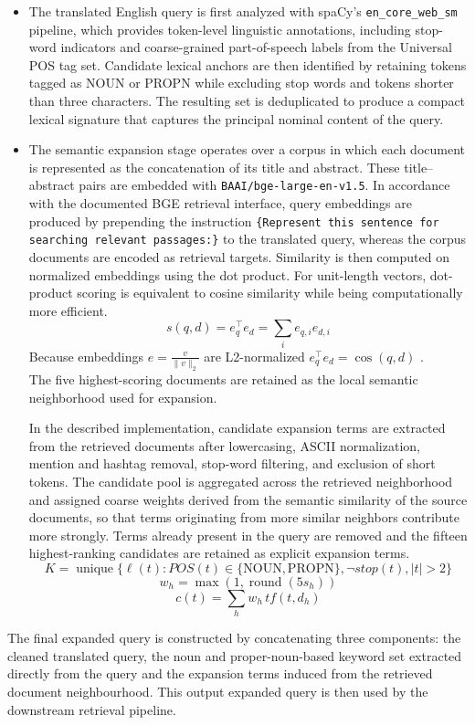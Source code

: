 \begin{itemize}
    \item The translated English query is first analyzed with spaCy’s \texttt{en\_core\_web\_sm} pipeline, which provides token-level linguistic annotations, including stop-word indicators and coarse-grained part-of-speech labels from the Universal POS tag set. Candidate lexical anchors are then identified by retaining tokens tagged as NOUN or PROPN while excluding stop words and tokens shorter than three characters. The resulting set is deduplicated to produce a compact lexical signature that captures the principal nominal content of the query. 
    
    \item The semantic expansion stage operates over a corpus in which each document is represented as the concatenation of its title and abstract. These title–abstract pairs are embedded with \texttt{BAAI/bge-large-en-v1.5}. In accordance with the documented BGE retrieval interface, query embeddings are produced by prepending the instruction \texttt{\{Represent this sentence for searching relevant passages:\}} to the translated query, whereas the corpus documents are encoded as retrieval targets. Similarity is then computed on normalized embeddings using the dot product. For unit-length vectors, dot-product scoring is equivalent to cosine similarity while being computationally more efficient. 
    $$s(q,d)=e_q^\top e_d=\sum_i e_{q,i}e_{d,i}$$
    Because embeddings \(e = \frac{v}{\lVert v\rVert_2}\) are L2-normalized \(e_q^\top e_d = \cos(q,d)\) \cite{bge_large_model_card}.\\
    The five highest-scoring documents are retained as the local semantic neighborhood used for expansion.

    In the described implementation, candidate expansion terms are extracted from the retrieved documents after lowercasing, ASCII normalization, mention and hashtag removal, stop-word filtering, and exclusion of short tokens. The candidate pool is aggregated across the retrieved neighborhood and assigned coarse weights derived from the semantic similarity of the source documents, so that terms originating from more similar neighbors contribute more strongly. Terms already present in the query are removed and the fifteen highest-ranking candidates are retained as explicit expansion terms.
    \[
K=\operatorname{unique}\{\ell(t): POS(t)\in\{\mathrm{NOUN},\mathrm{PROPN}\},\neg stop(t), |t|>2\}
\]
\[
w_h=\max(1,\operatorname{round}(5s_h))
\]
\[
c(t)=\sum_h w_h\,tf(t,d_h)
\]
\end{itemize}
The final expanded query is constructed by concatenating three components: the cleaned translated query, the noun and proper-noun-based keyword set extracted directly from the query and the expansion terms induced from the retrieved document neighbourhood.
This output expanded query is then used by the downstream retrieval pipeline.\\

